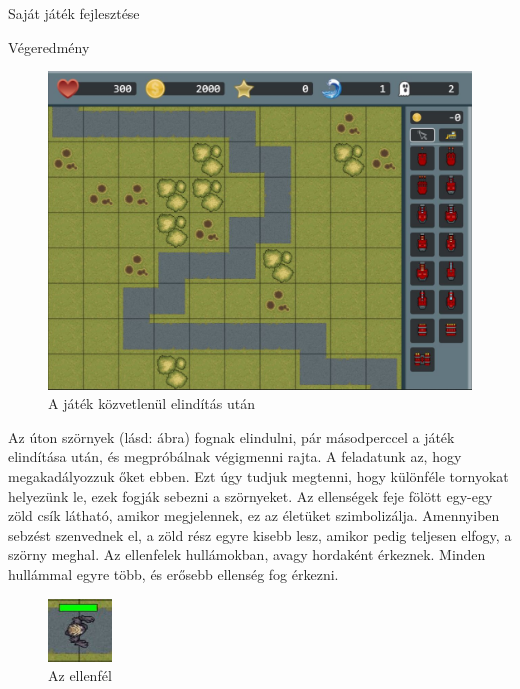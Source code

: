 \begin{MyChapter}{Saját játék fejlesztése}
\begin{MySection}{Végeredmény}
		\begin{figure}[H]
			\centering
			\includegraphics[scale=0.47]{kepek/jatekHasznalat/game_scene}
			\caption{A játék közvetlenül elindítás után}
			\label{fig:jatekHasznalat:game_scene}
		\end{figure}
		
		Az úton szörnyek (lásd:  ábra) fognak elindulni, pár másodperccel a játék elindítása után, és megpróbálnak végigmenni rajta.
		A feladatunk az, hogy megakadályozzuk őket ebben. Ezt úgy tudjuk megtenni, hogy különféle tornyokat helyezünk le, ezek fogják sebezni a szörnyeket.
		Az ellenségek feje fölött egy-egy zöld csík látható, amikor megjelennek, ez az életüket szimbolizálja. Amennyiben sebzést szenvednek el, a zöld rész egyre kisebb lesz, amikor pedig teljesen elfogy, a szörny meghal. Az ellenfelek hullámokban, avagy hordaként érkeznek. Minden hullámmal egyre több, és erősebb ellenség fog érkezni.
		
		\begin{figure}[H]
			\centering
			\includegraphics[width=0.15\textwidth]{kepek/jatekHasznalat/szorny}
			\caption{Az ellenfél}
			\label{fig:jatekHasznalat:szorny}
		\end{figure}
		

\end{MySection}
\end{MyChapter}
